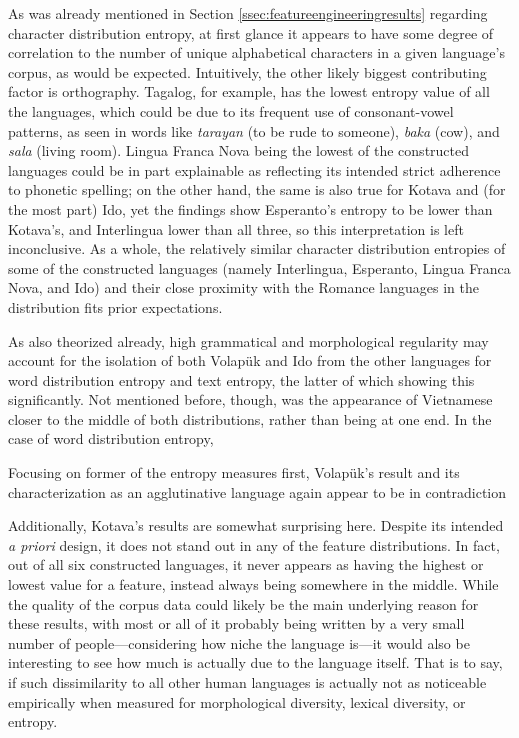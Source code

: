 \documentclass[12pt,a4paper]{article}
\numberwithin{figure}{section}
\numberwithin{table}{section}
\numberwithin{definition}{section}
\begin{document}
As was already mentioned in Section \ref{ssec:featureengineeringresults} regarding character distribution entropy, at first glance it appears to have some degree of correlation to the number of unique alphabetical characters in a given language's corpus, as would be expected. Intuitively, the other likely biggest contributing factor is orthography. Tagalog, for example, has the lowest entropy value of all the languages, which could be due to its frequent use of consonant-vowel patterns, as seen in words like \textit{tarayan} (to be rude to someone), \textit{baka} (cow), and \textit{sala} (living room). Lingua Franca Nova being the lowest of the constructed languages could be in part explainable as reflecting its intended strict adherence to phonetic spelling; on the other hand, the same is also true for Kotava and (for the most part) Ido, yet the findings show Esperanto's entropy to be lower than Kotava's, and Interlingua lower than all three, so this interpretation is left inconclusive. As a whole, the relatively similar character distribution entropies of some of the constructed languages (namely Interlingua, Esperanto, Lingua Franca Nova, and Ido) and their close proximity with the Romance languages in the distribution fits prior expectations. 

As also theorized already, high grammatical and morphological regularity may account for the isolation of both Volapük and Ido from the other languages for word distribution entropy and text entropy, the latter of which showing this significantly. Not mentioned before, though, was the appearance of Vietnamese closer to the middle of both distributions, rather than being at one end. In the case of word distribution entropy, 

Focusing on former of the entropy measures first, Volapük's result and its characterization as an agglutinative language again appear to be in contradiction 



Additionally, Kotava's results are somewhat surprising here. Despite its intended \textit{a priori} design, it does not stand out in any of the feature distributions. In fact, out of all six constructed languages, it never appears as having the highest or lowest value for a feature, instead always being somewhere in the middle. While the quality of the corpus data could likely be the main underlying reason for these results, with most or all of it probably being written by a very small number of people---considering how niche the language is---it would also be interesting to see how much is actually due to the language itself. That is to say, if such dissimilarity to all other human languages is actually not as noticeable empirically when measured for morphological diversity, lexical diversity, or entropy.
\end{document}
